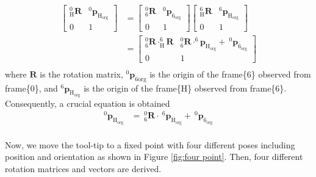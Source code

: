 \begin{equation}
\begin{split}																												
\begin{bmatrix}
_{\mathrm{H}}^{\mathrm{0}}\mathbf{R} & ^\mathrm{0}\!\boldsymbol{p}_\mathrm{H_{org}}\\ 
0 & 1
\end{bmatrix} &=
\begin{bmatrix}
_{\mathrm{6}}^{\mathrm{0}}\mathbf{R} & ^\mathrm{0}\!\boldsymbol{p}_\mathrm{6_{org}}\\ 
0 & 1
\end{bmatrix}
\begin{bmatrix}
_{\mathrm{H}}^{\mathrm{6}}\mathbf{R} & ^\mathrm{6}\!\boldsymbol{p}_\mathrm{H_{org}}\\ 
0 & 1
\end{bmatrix}\\
&= 
\begin{bmatrix}
_{\mathrm{6}}^{\mathrm{0}}\mathbf{R} \cdot _{\mathrm{H}}^{\mathrm{6}}\!\mathbf{R} & _{\mathrm{6}}^{\mathrm{0}}\mathbf{R} \cdot ^\mathrm{6}\!\!\boldsymbol{p}_\mathrm{H_{org}} +\ ^\mathrm{0}\!\boldsymbol{p}_\mathrm{6_{org}}\\ 
0 & 1
\end{bmatrix}\\
\end{split}
\end{equation}
where $\mathbf{R}$ is the rotation matrix, $^0\boldsymbol{p}_\mathrm{6org}$ is the origin of the frame\{6\} observed from frame\{0\}, and $^\mathrm{6}\!\!\boldsymbol{p}_\mathrm{H_{org}}$ is the origin of the frame\{H\} observed from frame\{6\}.
Consequently, a crucial equation is obtained
\begin{equation}
\begin{split}
^\mathrm{0}\!\boldsymbol{p}_\mathrm{H_{org}} &=\  _{\mathrm{6}}^{\mathrm{0}}\mathbf{R}\cdot\ ^\mathrm{6}\!\boldsymbol{p}_\mathrm{H_{org}} +\ ^\mathrm{0}\!\boldsymbol{p}_\mathrm{6_{org}}\\
\end{split}
\end{equation}
\par\noindent
Now, we move the tool-tip to a fixed point with four different poses including position and orientation as shown in Figure \ref{fig:four point}. Then, four different rotation matrices and vectors are derived. 

